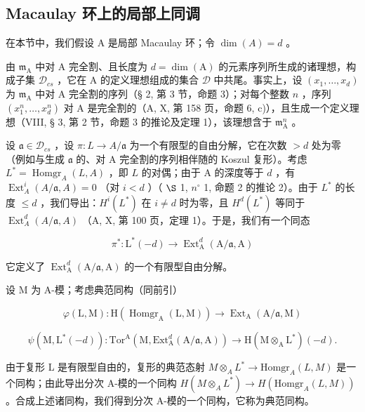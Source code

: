 \subsection{Macaulay 环上的局部上同调}

在本节中，我们假设 A 是局部 Macaulay 环；令 \(\dim(A) = d\) 。

由 \(\mathfrak{m}_{\mathrm{A}}\) 中对 A 完全割、且长度为 \(d = \dim (\mathrm{A})\) 的元素序列所生成的诸理想，构成子集 \(\mathcal{D}_{cs}\) ，它在 A 的定义理想组成的集合 \(\mathcal{D}\) 中共尾。事实上，设 \((x_{1},\ldots ,x_{d})\) 为 \(\mathfrak{m}_{\mathrm{A}}\) 中对 A 完全割的序列（§ 2, 第 3 节，命题 3）；对每个整数 \(n\) ，序列 \((x_1^n,\dots ,x_d^n)\) 对 A 是完全割的（A, X, 第 158 页，命题 6, c)），且生成一个定义理想（VIII, § 3, 第 2 节，命题 3 的推论及定理 1），该理想含于 \(\mathfrak{m}_{\mathrm{A}}^n\) 。

设 \(\mathfrak{a} \in \mathcal{D}_{cs}\) ，设 \(\pi: L \to A/\mathfrak{a}\) 为一个有限型的自由分解，它在次数 \(>d\) 处为零（例如与生成 \(\mathfrak{a}\) 的、对 A 完全割的序列相伴随的 Koszul 复形）。考虑 \(L^{*} = \operatorname{Homgr}_{A}(L,A)\) ，即 \(L\) 的对偶；由于 A 的深度等于 \(d\) ，有 \(\operatorname{Ext}_{A}^{i}(A/\mathfrak{a}, A) = 0\) （对 \(i < d\) ）（ \(\S\) 1, \(n^{\circ}\) 1, 命题 2 的推论 2）。由于 \(L^{*}\) 的长度 \(\leqslant d\) ，我们导出：\(H^{i}(L^{*})\) 在 \(i \neq d\) 时为零，且 \(H^{d}(L^{*})\) 等同于 \(\operatorname{Ext}_{A}^{d}(A/\mathfrak{a}, A)\) （A, X, 第 100 页，定理 1）。于是，我们有一个同态

\[
\pi^ {*}: \mathrm{L} ^ {*} (- d) \longrightarrow \operatorname{Ext} _ {\mathrm{A}} ^ {d} (\mathrm{A} / \mathfrak {a}, \mathrm{A})
\]

它定义了 \(\operatorname{Ext}_{\mathrm{A}}^{d}(\mathrm{A}/\mathfrak{a},\mathrm{A})\) 的一个有限型自由分解。

设 M 为 A-模；考虑典范同构（同前引）

\[
\varphi (\mathrm{L}, \mathrm{M}): \mathrm{H} (\operatorname{Homgr} _ {\mathrm{A}} (\mathrm{L}, \mathrm{M})) \rightarrow \operatorname{Ext} _ {\mathrm{A}} (\mathrm{A} / \mathfrak {a}, \mathrm{M})
\]

\[
\psi (\mathrm{M}, \mathrm{L} ^ {*} (- d)): \mathrm{Tor} ^ {\mathrm{A}} (\mathrm{M}, \mathrm{Ext} _ {\mathrm{A}} ^ {d} (\mathrm{A} / \mathfrak {a}, \mathrm{A})) \to \mathrm{H} (\mathrm{M} \otimes_ {\mathrm{A}} \mathrm{L} ^ {*}) (- d).
\]

由于复形 L 是有限型自由的，复形的典范态射 \(M \otimes_{A} L^{*} \to \text{Homgr}_{A}(L, M)\) 是一个同构；由此导出分次 A-模的一个同构 \(H(M \otimes_{A} L^{*}) \to H(\text{Homgr}_{A}(L, M))\) 。合成上述诸同构，我们得到分次 A-模的一个同构，它称为典范同构。

